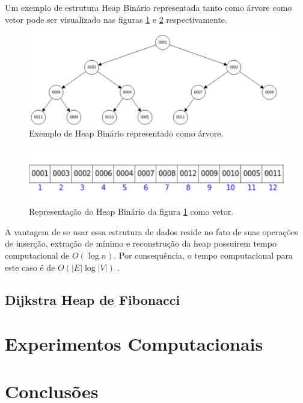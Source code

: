 Um exemplo de estrutura Heap Binário representada tanto como árvore como vetor pode ser visualizado nas figuras \ref{fig-dijkstra-heapbinario} e \ref{fig-dijkstra-heapvetor} respectivamente.

\begin{figure}[H]
\centering
\includegraphics[width=.95\textwidth]{figuras/Heap} 
\caption{Exemplo de Heap Binário representado como árvore.}
\label{fig-dijkstra-heapbinario}
\end{figure}

\begin{figure}[H]
\centering
\includegraphics[width=.60\textwidth]{figuras/Heap-vetor}
\caption{Representação do Heap Binário da figura \ref{fig-dijkstra-heapbinario} como vetor.}
\label{fig-dijkstra-heapvetor}
\end{figure}

A vantagem de se usar essa estrutura de dados reside no fato de suas operações de inserção, extração de mínimo e reconstrução da heap possuirem tempo computacional de $O(\log n)$. Por consequência, o tempo computacional para este caso é de $O(|E| \log |V|)$ \cite{cormen2009introduction}.

\subsection{Dijkstra Heap de Fibonacci}
\label{sec-dijkstra-versoes-fibonacci}


\section{Experimentos Computacionais}
\label{sec-dijkstra-experimentos}


\section{Conclusões}
\label{sec-dijkstra-conclusoes}
